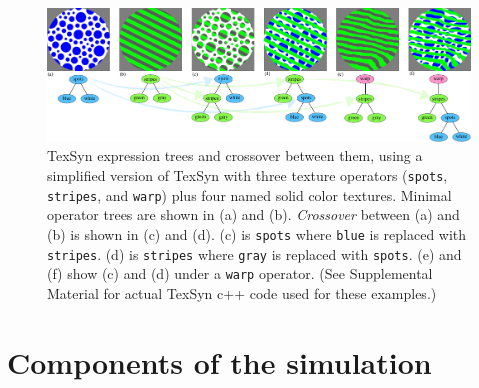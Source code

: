 \documentclass[acmtog]{acmart}
\begin{document}

\begin{figure}
    \includegraphics[width=\textwidth]{images/texsyn_overview.pdf}
    \caption{TexSyn expression trees and crossover between them, using a simplified version of TexSyn with three texture operators (\texttt{spots}, \texttt{stripes}, and \texttt{warp}) plus four named solid color textures. Minimal operator trees are shown in (a) and (b). \textit{Crossover} between (a) and (b) is shown in (c) and (d). (c) is \texttt{spots} where \texttt{blue} is replaced with \texttt{stripes}. (d) is \texttt{stripes} where \texttt{gray} is replaced with \texttt{spots}. (e) and (f) show (c) and (d) under a \texttt{warp} operator. (See Supplemental Material for actual TexSyn c++ code used for these examples.)}
    \label{fig:TexSyn_overview}
\end{figure}



\section{Components of the simulation}
\end{document}
